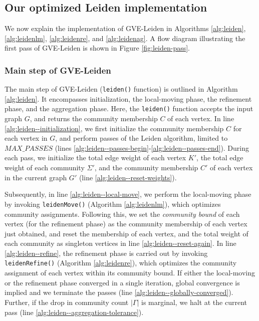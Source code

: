 







\subsection{Our optimized Leiden implementation}

We now explain the implementation of GVE-Leiden in Algorithms \ref{alg:leiden}, \ref{alg:leidenlm}, \ref{alg:leidenre}, and \ref{alg:leidenag}. A flow diagram illustrating the first pass of GVE-Leiden is shown in Figure \ref{fig:leiden-pass}.


\subsubsection{Main step of GVE-Leiden}

The main step of GVE-Leiden (\texttt{leiden()} function) is outlined in Algorithm \ref{alg:leiden}. It encompasses initialization, the local-moving phase, the refinement phase, and the aggregation phase. Here, the \texttt{leiden()} function accepts the input graph $G$, and returns the community membership $C$ of each vertex. In line \ref{alg:leiden--initialization}, we first initialize the community membership $C$ for each vertex in $G$, and perform passes of the Leiden algorithm, limited to $MAX\_PASSES$ (lines \ref{alg:leiden--passes-begin}-\ref{alg:leiden--passes-end}). During each pass, we initialize the total edge weight of each vertex $K'$, the total edge weight of each community $\Sigma'$, and the community membership $C'$ of each vertex in the current graph $G'$ (line \ref{alg:leiden--reset-weights}).

Subsequently, in line \ref{alg:leiden--local-move}, we perform the local-moving phase by invoking \texttt{leidenMove()} (Algorithm \ref{alg:leidenlm}), which optimizes community assignments. Following this, we set the \textit{community bound} of each vertex (for the refinement phase) as the community membership of each vertex just obtained, and reset the membership of each vertex, and the total weight of each community as singleton vertices in line \ref{alg:leiden--reset-again}. In line \ref{alg:leiden--refine}, the refinement phase is carried out by invoking \texttt{leidenRefine()} (Algorithm \ref{alg:leidenre}), which optimizes the community assignment of each vertex within its community bound. If either the local-moving or the refinement phase converged in a single iteration, global convergence is implied and we terminate the passes (line \ref{alg:leiden--globally-converged}). Further, if the drop in community count $|\Gamma|$ is marginal, we halt at the current pass (line \ref{alg:leiden--aggregation-tolerance}).

